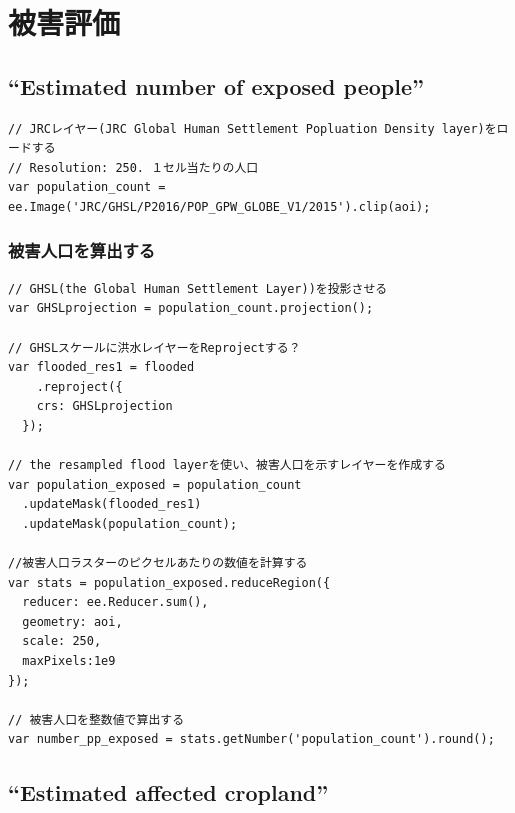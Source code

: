 \documentclass[
]{book}
\begin{document}
\hypertarget{ux88abux5bb3ux8a55ux4fa1}{%
\chapter{被害評価}\label{ux88abux5bb3ux8a55ux4fa1}}

\hypertarget{estimated-number-of-exposed-people}{%
\section{``Estimated number of exposed people''}\label{estimated-number-of-exposed-people}}

\begin{verbatim}
// JRCレイヤー(JRC Global Human Settlement Popluation Density layer)をロードする
// Resolution: 250. １セル当たりの人口
var population_count = ee.Image('JRC/GHSL/P2016/POP_GPW_GLOBE_V1/2015').clip(aoi);
\end{verbatim}

\hypertarget{ux88abux5bb3ux4ebaux53e3ux3092ux7b97ux51faux3059ux308b}{%
\subsection{被害人口を算出する}\label{ux88abux5bb3ux4ebaux53e3ux3092ux7b97ux51faux3059ux308b}}

\begin{verbatim}
// GHSL(the Global Human Settlement Layer))を投影させる
var GHSLprojection = population_count.projection();

// GHSLスケールに洪水レイヤーをReprojectする？
var flooded_res1 = flooded
    .reproject({
    crs: GHSLprojection
  });

// the resampled flood layerを使い、被害人口を示すレイヤーを作成する
var population_exposed = population_count
  .updateMask(flooded_res1)
  .updateMask(population_count);

//被害人口ラスターのピクセルあたりの数値を計算する 
var stats = population_exposed.reduceRegion({
  reducer: ee.Reducer.sum(),
  geometry: aoi,
  scale: 250,
  maxPixels:1e9 
});

// 被害人口を整数値で算出する
var number_pp_exposed = stats.getNumber('population_count').round();
\end{verbatim}

\hypertarget{estimated-affected-cropland}{%
\section{``Estimated affected cropland''}\label{estimated-affected-cropland}}
\end{document}
